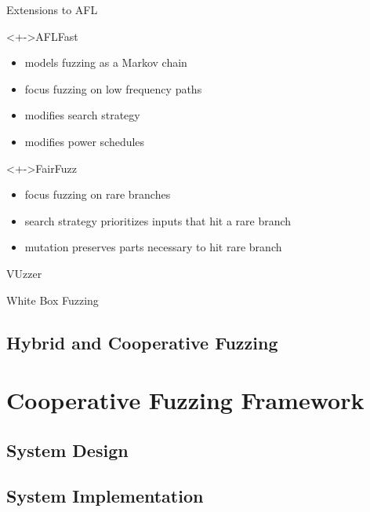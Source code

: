 \documentclass{beamer}
\begin{document}
\begin{frame}{Extensions to AFL}
    \begin{block}<+->{AFLFast}
        \begin{itemize}[<+->]
            \item{} models fuzzing as a Markov chain
            \item{} focus fuzzing on low frequency paths
            \item{} modifies search strategy
            \item{} modifies power schedules
        \end{itemize}
    \end{block}
    \begin{block}<+->{FairFuzz}
        \begin{itemize}[<+->]
            \item{} focus fuzzing on rare branches
            \item{} search strategy prioritizes inputs that hit a rare branch
            \item{} mutation preserves parts necessary to hit rare branch
        \end{itemize}
    \end{block}
\end{frame}

\begin{frame}{VUzzer}
\end{frame}

\begin{frame}{White Box Fuzzing}
\end{frame}

\subsection{Hybrid and Cooperative Fuzzing}

\section{Cooperative Fuzzing Framework}

\subsection{System Design}

\subsection{System Implementation}
\end{document}
